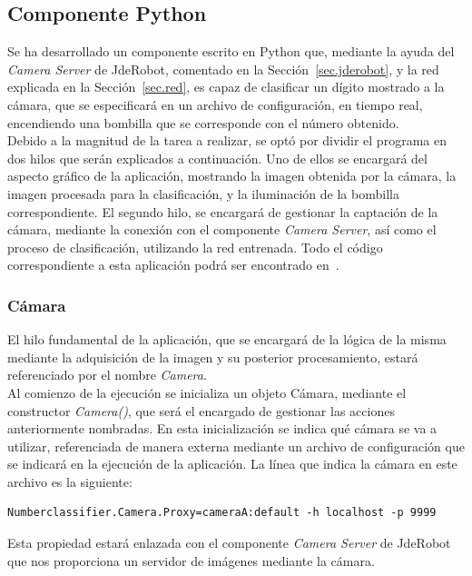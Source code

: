 \subsection{Componente Python} \label{sec.componente}
Se ha desarrollado un componente escrito en Python que, mediante la ayuda del \textit{Camera Server} de JdeRobot, comentado en la Sección~\ref{sec.jderobot},  y la red explicada en la Sección~\ref{sec.red}, es capaz de clasificar un dígito mostrado a la cámara, que se especificará en un archivo de configuración, en tiempo real, encendiendo una bombilla que se corresponde con el número obtenido.\\

Debido a la magnitud de la tarea a realizar, se optó por dividir el programa en dos hilos que serán explicados a continuación. Uno de ellos se encargará del aspecto gráfico de la aplicación, mostrando la imagen obtenida por la cámara, la imagen procesada para la clasificación, y la iluminación de la bombilla correspondiente. El segundo hilo, se encargará de gestionar la captación de la cámara, mediante la conexión con el componente \textit{Camera Server}, así como el proceso de clasificación, utilizando la red entrenada. Todo el código correspondiente a esta aplicación podrá ser encontrado en~\cite{codigo}.\\

\subsubsection{Cámara} \label{sec.camara}
El hilo fundamental de la aplicación, que se encargará de la lógica de la misma mediante la adquisición de la imagen y su posterior procesamiento, estará referenciado por el nombre \textit{Camera}.\\

Al comienzo de la ejecución se inicializa un objeto Cámara, mediante el constructor \textit{Camera()}, que será el encargado de gestionar las acciones anteriormente nombradas. En esta inicialización se indica qué cámara se va a utilizar, referenciada de manera externa mediante un archivo de configuración que se indicará en la ejecución de la aplicación. La línea que indica la cámara en este archivo es la siguiente:
\vspace{10pt}
\begin{lstlisting}[frame=single]
	Numberclassifier.Camera.Proxy=cameraA:default -h localhost -p 9999
\end{lstlisting}

Esta propiedad estará enlazada con el componente \textit{Camera Server} de JdeRobot que nos proporciona un servidor de imágenes mediante la cámara.\\

